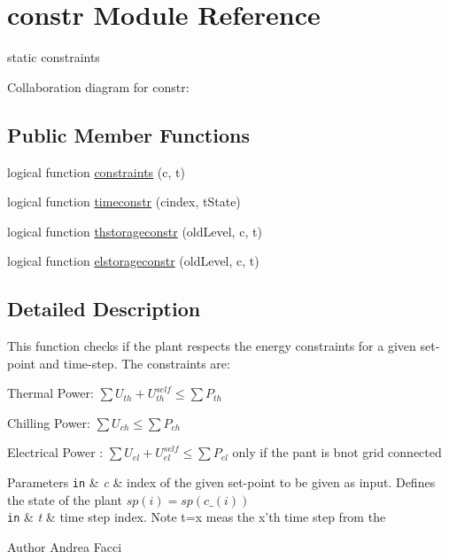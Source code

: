\hypertarget{classconstr}{\section{constr Module Reference}
\label{classconstr}
}


static constraints  




Collaboration diagram for constr\-:
\subsection*{Public Member Functions}
\begin{DoxyCompactItemize}
\item 
logical function \hyperlink{classconstr_a2e4697c7ad9fa86cef6903a66f9b2a5a}{constraints} (c, t)
\item 
logical function \hyperlink{classconstr_a09f37706c4e72fa0b97fe46ffa42443f}{timeconstr} (cindex, t\-State)
\item 
logical function \hyperlink{classconstr_afb13926311e9a3b5dcaeb0c764791b12}{thstorageconstr} (old\-Level, c, t)
\item 
logical function \hyperlink{classconstr_ab630a36bd00e0335024da62e048db721}{elstorageconstr} (old\-Level, c, t)
\end{DoxyCompactItemize}


\subsection{Detailed Description}
This function checks if the plant respects the energy constraints for a given set-\/point and time-\/step. The constraints are\-:\par

\begin{DoxyItemize}
\item Thermal Power\-: $ \sum U_{th} + U_{th}^{self} \le \sum P_{th}$
\item Chilling Power\-: $ \sum U_{ch} \le \sum P_{ch}$
\item Electrical Power \-: $ \sum U_{el} + U_{el}^{self} \le \sum P_{el}$ only if the pant is bnot grid connected 
\begin{DoxyParams}[1]{Parameters}
\mbox{\tt in}  & {\em c} & index of the given set-\/point to be given as input. Defines the state of the plant $sp(i) = sp(c\_(i))$ \\
\hline
\mbox{\tt in}  & {\em t} & time step index. Note t=x meas the x'th time step from the \\
\hline
\end{DoxyParams}
\begin{DoxyAuthor}{Author}
Andrea Facci 
\end{DoxyAuthor}

\end{DoxyItemize}

